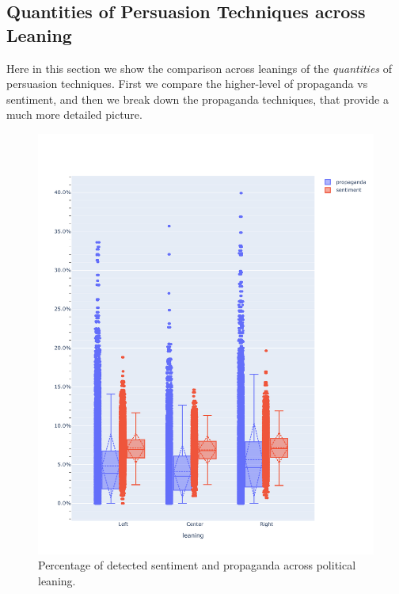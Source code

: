 \subsection{Quantities of Persuasion Techniques across Leaning}

Here in this section we show the comparison across leanings of the \emph{quantities} of persuasion techniques.
First we compare the higher-level of propaganda vs sentiment, and then we break down the propaganda techniques, that provide a much more detailed picture.

\begin{figure}[!htbp]
    \centering
    \includegraphics[width=\linewidth]{figures/prop_sent_tech_across_leaning_headlines_mod.pdf} %
    \caption{Percentage of detected sentiment and propaganda across political leaning.}
    \label{fig:prop_sent_across_leaning}
\end{figure}

